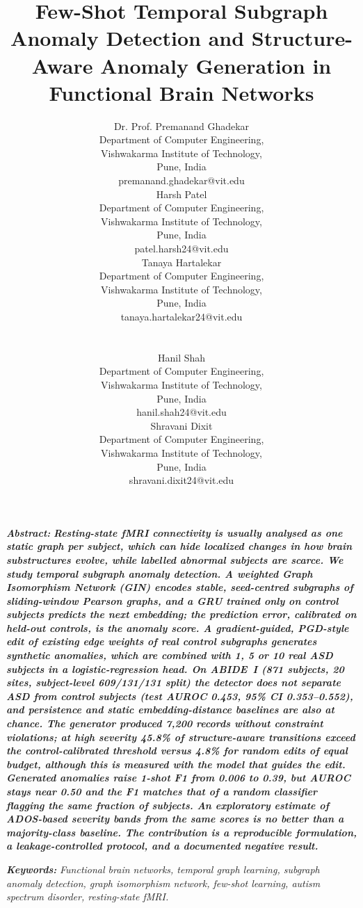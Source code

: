 \documentclass[conference]{IEEEtran}
\newcommand{\authbox}[2]{\begin{minipage}[t]{0.32\textwidth}\centering\fontsize{7.5}{9}\selectfont #1\\ Department of Computer Engineering,\\ Vishwakarma Institute of Technology,\\ Pune, India\\ #2\end{minipage}}
\begin{document}
\title{Few-Shot Temporal Subgraph Anomaly Detection and Structure-Aware Anomaly Generation in Functional Brain Networks}

\author{%
\authbox{Dr. Prof. Premanand Ghadekar}{premanand.ghadekar@vit.edu}\hfill
\authbox{Harsh Patel}{patel.harsh24@vit.edu}\hfill
\authbox{Tanaya Hartalekar}{tanaya.hartalekar24@vit.edu}\\[1.6em]
\authbox{Hanil Shah}{hanil.shah24@vit.edu}\hspace{0.12\textwidth}
\authbox{Shravani Dixit}{shravani.dixit24@vit.edu}}

\maketitle

\noindent\textbf{\textit{Abstract:}} \textbf{\textit{Resting-state fMRI connectivity is usually analysed as one static graph per subject, which can hide localized changes in how brain substructures evolve, while labelled abnormal subjects are scarce. We study temporal subgraph anomaly detection. A weighted Graph Isomorphism Network (GIN) encodes stable, seed-centred subgraphs of sliding-window Pearson graphs, and a GRU trained only on control subjects predicts the next embedding; the prediction error, calibrated on held-out controls, is the anomaly score. A gradient-guided, PGD-style edit of existing edge weights of real control subgraphs generates synthetic anomalies, which are combined with 1, 5 or 10 real ASD subjects in a logistic-regression head. On ABIDE~I (871 subjects, 20 sites, subject-level 609/131/131 split) the detector does not separate ASD from control subjects (test AUROC 0.453, 95\% CI 0.353--0.552), and persistence and static embedding-distance baselines are also at chance. The generator produced 7,200 records without constraint violations; at high severity 45.8\% of structure-aware transitions exceed the control-calibrated threshold versus 4.8\% for random edits of equal budget, although this is measured with the model that guides the edit. Generated anomalies raise 1-shot F1 from 0.006 to 0.39, but AUROC stays near 0.50 and the F1 matches that of a random classifier flagging the same fraction of subjects. An exploratory estimate of ADOS-based severity bands from the same scores is no better than a majority-class baseline. The contribution is a reproducible formulation, a leakage-controlled protocol, and a documented negative result.}}

\medskip\noindent\textbf{\textit{Keywords:}} \textit{Functional brain networks, temporal graph learning, subgraph anomaly detection, graph isomorphism network, few-shot learning, autism spectrum disorder, resting-state fMRI.}
\end{document}
